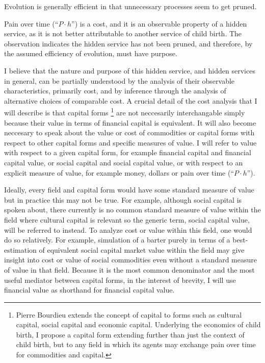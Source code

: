 \documentclass[11pt]{book}
\begin{document}
Evolution is generally efficient in that unnecessary processes seem to get pruned.

Pain over time (``$P{\cdot}h$'') is a cost, and it is an observable property of a hidden service, as it is not better attributable to another service of child birth. The observation indicates the hidden service has not been pruned, and therefore, by the assumed efficiency of evolution, must have purpose.

I believe that the nature and purpose of this hidden service, and hidden services in general, can be partially understood by the analysis of their observable characteristics, primarily cost, and by inference through the analysis of alternative choices of comparable cost. A crucial detail of the cost analysis that I will describe is that capital forms%
\footnote{Pierre Bourdieu extends the concept of capital to forms such as cultural capital, social capital and economic capital. Underlying the economics of child birth, I propose a capital form extending further than just the context of child birth, but to any field in which its agents may exchange pain over time  for commodities and capital.}
are not neccesarily interchangable simply because their value in terms of financial capital is equivalent. It will also become neccesary to speak about the value or cost of commodities or capital forms with respect to other capital forms and specific measures of value. I will refer to value with respect to a given capital form, for example financial capital and financial capital value, or social capital and social capital value, or with respect to an explicit measure of value, for example money, dollars or pain over time (``$P{\cdot}h$'').

Ideally, every field and capital form would have some standard measure of value but in practice this may not be true. For example, although social capital is spoken about, there currently is no common standard measure of value within the field where cultural capital is relevant so the generic term, social capital value, will be referred to instead. To analyze cost or value within this field, one would do so relatively. For example, simulation of a barter purely in terms of a best-estimation of equivalent social capital market value within the field may give insight into cost or value of social commodities even without a standard measure of value in that field. Because it is the most common denominator and the most useful mediator between capital forms, in the interest of brevity, I will use financial value as shorthand for financial capital value.
\end{document}
